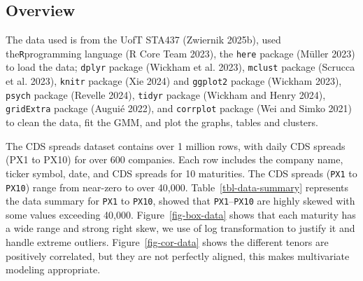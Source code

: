 \documentclass[
  letterpaper,
  DIV=11,
  numbers=noendperiod]{scrartcl}
\begin{document}
\hypertarget{overview}{%
\subsection{Overview}\label{overview}}

The data used is from the UofT STA437 (Zwiernik 2025b), used
the\texttt{R}programming language (R Core Team 2023), the \texttt{here}
package (Müller 2023) to load the data; \texttt{dplyr} package (Wickham
et al. 2023), \texttt{mclust} package (Scrucca et al. 2023),
\texttt{knitr} package (Xie 2024) and \texttt{ggplot2} package (Wickham
2023), \texttt{psych} package (Revelle 2024), \texttt{tidyr} package
(Wickham and Henry 2024), \texttt{gridExtra} package (Auguié 2022), and
\texttt{corrplot} package (Wei and Simko 2021) to clean the data, fit
the GMM, and plot the graphs, tables and clusters.

The CDS spreads dataset contains over 1 million rows, with daily CDS
spreads (PX1 to PX10) for over 600 companies. Each row includes the
company name, ticker symbol, date, and CDS spreads for 10 maturities.
The CDS spreads (\texttt{PX1} to \texttt{PX10}) range from near-zero to
over 40,000. Table~\ref{tbl-data-summary} represents the data summary
for \texttt{PX1} to \texttt{PX10}, showed that
\texttt{PX1}--\texttt{PX10} are highly skewed with some values exceeding
40,000. Figure~\ref{fig-box-data} shows that each maturity has a wide
range and strong right skew, we use of log transformation to justify it
and handle extreme outliers. Figure~\ref{fig-cor-data} shows the
different tenors are positively correlated, but they are not perfectly
aligned, this makes multivariate modeling appropriate.
\end{document}

